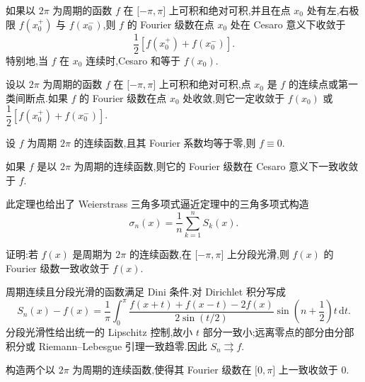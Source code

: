 \begin{theorem}[Fejer 定理 $*$]
    如果以 $2\pi$ 为周期的函数 $f$ 在 $\lbrack -\pi,\pi\rbrack$ 上可积和绝对可积,并且在点 $x_0$ 处有左,右极限 $f(x_0^+)$ 与 $f(x_0^-)$,则 $f$ 的 Fourier 级数在点 $x_0$ 处在 Cesaro 意义下收敛于
    \[
        \dfrac{1}{2}[f(x_0^+)+f(x_0^-)].
    \]
    特别地,当 $f$ 在 $x_0$ 连续时,Cesaro 和等于 $f(x_0)$.
\end{theorem}

\begin{theorem}[\markstar]
    设以 $2\pi$ 为周期的函数 $f$ 在 $\lbrack -\pi,\pi\rbrack$ 上可积和绝对可积,点 $x_0$ 是 $f$ 的连续点或第一类间断点.如果 $f$ 的 Fourier 级数在点 $x_0$ 处收敛,则它一定收敛于 $f(x_0)$ 或 $\dfrac{1}{2}[f(x_0^+)+f(x_0^-)]$.
\end{theorem}

\begin{theorem}
    设 $f$ 为周期 $2\pi$ 的连续函数,且其 Fourier 系数均等于零,则 $f\equiv0$.
\end{theorem}

\begin{theorem}[$*$]
    如果 $f$ 是以 $2\pi$ 为周期的连续函数,则它的 Fourier 级数在 Cesaro 意义下一致收敛于 $f$.
\end{theorem}

\begin{remark}
    此定理也给出了 Weierstrass 三角多项式逼近定理中的三角多项式构造
    \[
        \sigma_n(x)=\dfrac{1}{n}\sum\limits_{k=1}^{n}S_k(x).
    \]
\end{remark}

\begin{example}
    证明:若 $f(x)$ 是周期为 $2\pi$ 的连续函数,在 $\lbrack -\pi,\pi\rbrack$ 上分段光滑,则 $f(x)$ 的 Fourier 级数一致收敛于 $f(x)$.
\end{example}
\exampleblank

\begin{solution}
    周期连续且分段光滑的函数满足 Dini 条件.对 Dirichlet 积分写成
    \[
        S_n(x)-f(x)=\dfrac{1}{\pi}\int_0^\pi
        \dfrac{f(x+t)+f(x-t)-2f(x)}{2\sin(t/2)}
        \sin\left(n+\dfrac{1}{2}\right)t\,\mathrm{d}t.
    \]
    分段光滑性给出统一的 Lipschitz 控制,故小 $t$ 部分一致小;远离零点的部分由分部积分或 Riemann--Lebesgue 引理一致趋零.因此 $S_n\rightrightarrows f$.
\end{solution}

\begin{example}
    构造两个以 $2\pi$ 为周期的连续函数,使得其 Fourier 级数在 $\lbrack 0,\pi\rbrack$ 上一致收敛于 $0$.
\end{example}
\exampleblank

